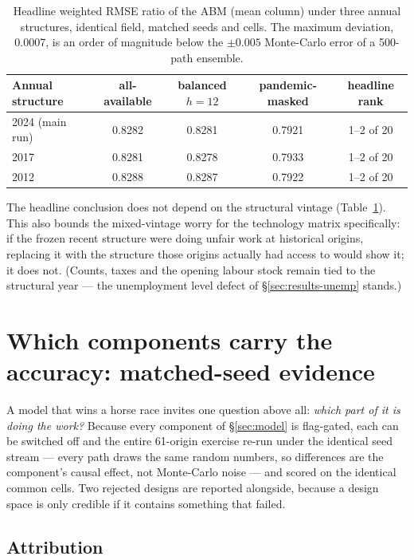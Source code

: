 \documentclass[11pt,a4paper]{article}
\begin{document}
\begin{table}[h]
\centering
\caption{Headline weighted RMSE ratio of the ABM (mean column) under three annual structures,
identical field, matched seeds and cells. The maximum deviation, 0.0007, is an order of magnitude
below the $\pm0.005$ Monte-Carlo error of a 500-path ensemble.}
\label{tab:vintage}
\small
\begin{tabular}{@{}lcccc@{}}
\toprule
Annual structure & all-available & balanced $h{=}12$ & pandemic-masked & headline rank \\
\midrule
2024 (main run) & 0.8282 & 0.8281 & 0.7921 & 1--2 of 20 \\
2017 & 0.8281 & 0.8278 & 0.7933 & 1--2 of 20 \\
2012 & 0.8288 & 0.8287 & 0.7922 & 1--2 of 20 \\
\bottomrule
\end{tabular}
\end{table}

The headline conclusion does not depend on the structural vintage
(Table~\ref{tab:vintage}). This also bounds the mixed-vintage worry for the technology matrix
specifically: if the frozen recent structure were doing unfair work at historical origins,
replacing it with the structure those origins actually had access to would show it; it does not.
(Counts, taxes and the opening labour stock remain tied to the structural year --- the
unemployment level defect of \S\ref{sec:results-unemp} stands.)

\FloatBarrier
\section{Which components carry the accuracy: matched-seed evidence}
\label{sec:evidence}

A model that wins a horse race invites one question above all: \emph{which part of it is doing
the work?} Because every component of \S\ref{sec:model} is flag-gated, each can be switched off
and the entire 61-origin exercise re-run under the identical seed stream --- every path draws the
same random numbers, so differences are the component's causal effect, not Monte-Carlo noise ---
and scored on the identical common cells. Two rejected designs are reported alongside, because a
design space is only credible if it contains something that failed.

\subsection{Attribution}
\label{sec:evidence-attrib}
\end{document}
